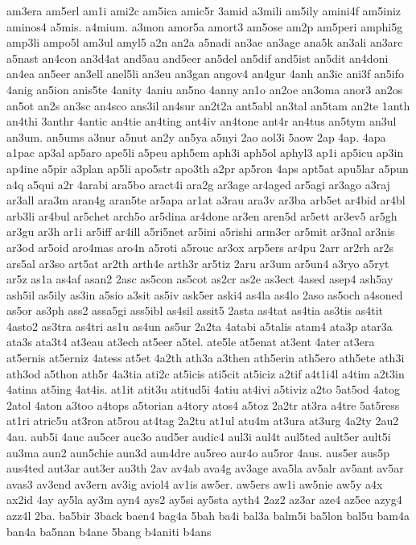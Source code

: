 {am3era
am5erl
am1i
ami2c
am5ica
amic5r
3amid
a3mili
am5ily
amini4f
am5iniz
aminos4
a5mis.
a4mium.
a3mon
amor5a
amort3
am5ose
am2p
am5peri
amphi5g
amp3li
ampo5l
am3ul
amyl5
a2n
an2a
a5nadi
an3ae
an3age
ana5k
an3ali
an3arc
a5nast
an4con
an3d4at
and5au
and5eer
an5del
an5dif
and5ist
an5dit
an4doni
an4ea
an5eer
an3ell
anel5li
an3eu
an3gan
angov4
an4gur
4anh
an3ic
ani3f
an5ifo
4anig
an5ion
anis5te
4anity
4aniu
an5no
4anny
an1o
an2oe
an3oma
anor3
an2os
an5ot
an2s
an3sc
an4sco
ans3il
an4sur
an2t2a
ant5abl
an3tal
an5tam
an2te
1anth
an4thi
3anthr
4antic
an4tie
an4ting
ant4iv
an4tone
ant4r
an4tus
an5tym
an3ul
an3um.
an5ums
a3nur
a5nut
an2y
an5ya
a5nyi
2ao
aol3i
5aow
2ap
4ap.
4apa
a1pac
ap3al
ap5aro
ape5li
a5peu
aph5em
aph3i
aph5ol
aphyl3
ap1i
ap5icu
ap3in
ap4ine
a5pir
a3plan
ap5li
apo5str
apo3th
a2pr
ap5ron
4aps
apt5at
apu5lar
a5pun
a4q
a5qui
a2r
4arabi
ara5bo
aract4i
ara2g
ar3age
ar4aged
ar5agi
ar3ago
a3raj
ar3all
ara3m
aran4g
aran5te
ar5apa
ar1at
a3rau
ara3v
ar3ba
arb5et
ar4bid
ar4bl
arb3li
ar4bul
ar5chet
arch5o
ar5dina
ar4done
ar3en
aren5d
ar5ett
ar3ev5
ar5gh
ar3gu
ar3h
ar1i
ar5iff
ar4ill
a5ri5net
ar5ini
a5rishi
arm3er
ar5mit
ar3nal
ar3nis
ar3od
ar5oid
aro4mas
aro4n
a5roti
a5rouc
ar3ox
arp5ers
ar4pu
2arr
ar2rh
ar2s
ars5al
ar3so
art5at
ar2th
arth4e
arth3r
ar5tiz
2aru
ar3um
ar5un4
a3ryo
a5ryt
ar5z
as1a
as4af
asan2
2asc
as5con
as5cot
as2cr
as2e
as3ect
4ased
asep4
ash5ay
ash5il
as5ily
as3in
a5sio
a3sit
as5iv
ask5er
aski4
as4la
as4lo
2aso
as5och
a4soned
as5or
as3ph
ass2
assa5gi
ass5ibl
as4sil
assit5
2asta
as4tat
as4tia
as3tis
as4tit
4asto2
as3tra
as4tri
as1u
as4un
as5ur
2a2ta
4atabi
a5talis
atam4
ata3p
atar3a
ata3s
ata3t4
at3eau
at3ech
at5eer
a5tel.
ate5le
at5enat
at3ent
4ater
at3era
at5ernis
at5erniz
4atess
at5et
4a2th
ath3a
a3then
ath5erin
ath5ero
ath5ete
ath3i
ath3od
a5thon
ath5r
4a3tia
ati2c
at5icis
ati5cit
at5iciz
a2tif
a4t1i4l
a4tim
a2t3in
4atina
at5ing
4at4is.
at1it
atit3u
atitud5i
4atiu
at4ivi
a5tiviz
a2to
5at5od
4atog
2atol
4aton
a3too
a4tops
a5torian
a4tory
atos4
a5toz
2a2tr
at3ra
a4tre
5at5ress
at1ri
atric5u
at3ron
at5rou
at4tag
2a2tu
at1ul
atu4m
at3ura
at3urg
4a2ty
2au2
4au.
aub5i
4auc
au5cer
auc3o
aud5er
audic4
aul3i
aul4t
aul5ted
ault5er
ault5i
au3ma
aun2
aun5chie
aun3d
aun4dre
au5reo
aur4o
au5ror
4aus.
aus5er
aus5p
aus4ted
aut3ar
aut3er
au3th
2av
av4ab
ava4g
av3age
ava5la
av5alr
av5ant
av5ar
avas3
av3end
av3ern
av3ig
aviol4
av1is
aw5er.
aw5ers
aw1i
aw5nie
aw5y
a4x
ax2id
4ay
ay5la
ay3m
ayn4
ays2
ay5si
ay5sta
ayth4
2az2
az3ar
aze4
az5ee
azyg4
azz4l
2ba.
ba5bir
3back
baen4
bag4a
5bah
ba4i
bal3a
balm5i
ba5lon
bal5u
bam4a
ban4a
ba5nan
b4ane
5bang
b4aniti
b4ans
}
